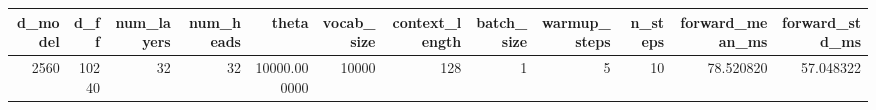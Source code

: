 \begin{tabular}{rrrrrrrrrrrr}
\toprule
d_model & d_ff & num_layers & num_heads & theta & vocab_size & context_length & batch_size & warmup_steps & n_steps & forward_mean_ms & forward_std_ms \\
\midrule
2560 & 10240 & 32 & 32 & 10000.000000 & 10000 & 128 & 1 & 5 & 10 & 78.520820 & 57.048322 \\
\bottomrule
\end{tabular}
